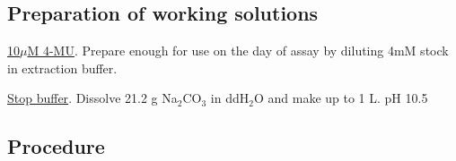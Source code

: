 \documentclass[a4paper,12pt]{article}
\newenvironment{packed_enum}{
\begin{enumerate}
  \setlength{\itemsep}{1pt}
  \setlength{\parskip}{0pt}
  \setlength{\parsep}{0pt}
}{\end{enumerate}}
\begin{document}
	\subsection{Preparation of working solutions}
	\begin{packed_enum}
		\item {\underline{10$\mu$M 4-MU}}. Prepare enough for use on the day of assay by diluting 4mM stock in extraction buffer.
		\item {\underline{Stop buffer}}. Dissolve 21.2 g Na$_{2}$CO$_{3}$ in ddH$_{2}$O and make up to 1 L. pH 10.5
	\end{packed_enum}
	\subsection{Procedure}
	
\end{document}
